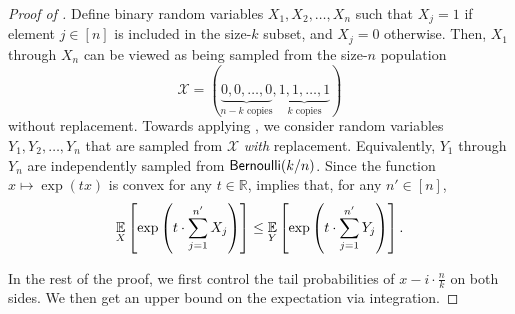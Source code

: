\begin{proof}[Proof of ]
Define binary random variables $X_1, X_2, \ldots, X_n$ such that $X_j = 1$ if  element $j \in [n]$ is included in the size-$k$ subset, and $X_j = 0$ otherwise. Then, $X_1$ through $X_n$ can be viewed as being sampled from the size-$n$ population
\[
    \mathcal{X} = (\underbrace{0, 0, \ldots, 0}_{n-k\text{ copies}}, \underbrace{1, 1, \ldots, 1}_{k\text{ copies}})
\]
without replacement. Towards applying , we consider random variables $Y_1, Y_2, \ldots, Y_n$ that are sampled from $\mathcal{X}$ \emph{with} replacement. Equivalently, $Y_1$ through $Y_n$ are independently sampled from $\mathsf{Bernoulli}(k/n)$. Since the function $x \mapsto \exp(tx)$ is convex for any $t \in \mathbb{R}$,  implies that, for any $n' \in [n]$,
\begin{equation}\label{eq:without-to-with-replacement}
    \operatorname*{\mathbb{E}}_{X}\left[\exp\left(t\cdot \sum_{j=1}^{n'}X_j\right)\right]
\le \operatorname*{\mathbb{E}}_{Y}\left[\exp\left(t\cdot \sum_{j=1}^{n'}Y_j\right)\right].
\end{equation}

In the rest of the proof, we first control the tail probabilities of $x - i\cdot \frac{n}{k}$ on both sides. We then get an upper bound on the expectation via integration.


\end{proof}
